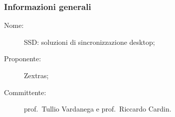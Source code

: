 \subsubsection{Informazioni generali}
\begin{description}
	\item[Nome:] SSD: soluzioni di sincronizzazione desktop;
	\item[Proponente:] Zextras;
	\item[Committente:] prof.~Tullio Vardanega e prof.~Riccardo Cardin.
\end{description}








%
